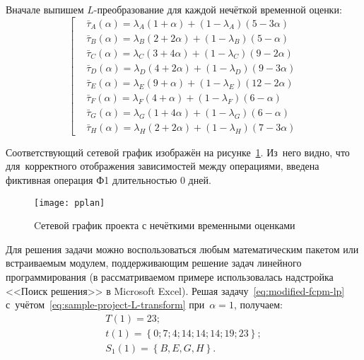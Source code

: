 Вначале выпишем $L$-преобразование для каждой нечёткой временной оценки:
\begin{equation}
\label{eq:sample-project-L-transform}
\left[ \begin{aligned}
   & \bar{\tau}_A\left( \alpha \right)=\lambda_A\left( 1+\alpha \right)+\left( 1-\lambda_A \right)\left( 5-3\alpha \right) \\ 
   & \bar{\tau}_B\left( \alpha \right)=\lambda_B\left( 2+2\alpha \right)+\left( 1-\lambda_B \right)\left( 5-\alpha \right) \\ 
   & \bar{\tau}_C\left( \alpha \right)=\lambda_C\left( 3+4\alpha \right)+\left( 1-\lambda_C \right)\left( 9-2\alpha \right) \\ 
   & \bar{\tau}_D\left( \alpha \right)=\lambda_D\left( 4+2\alpha \right)+\left( 1-\lambda_D \right)\left( 9-3\alpha \right) \\ 
   & \bar{\tau}_E\left( \alpha \right)=\lambda_E\left( 9+\alpha \right)+\left( 1-\lambda_E \right)\left( 12-2\alpha \right) \\ 
   & \bar{\tau}_F\left( \alpha \right)=\lambda_F\left( 4+\alpha \right)+\left( 1-\lambda_F \right)\left( 6-\alpha \right) \\ 
   & \bar{\tau}_G\left( \alpha \right)=\lambda_G\left( 1+4\alpha \right)+\left( 1-\lambda_G \right)\left( 6-\alpha \right) \\ 
   & \bar{\tau}_H\left( \alpha \right)=\lambda_H\left( 2+2\alpha \right)+\left( 1-\lambda_H \right)\left( 7-3\alpha \right)
\end{aligned} \right.
\end{equation}

Соответствующий сетевой график изображён на рисунке~\ref{fig:pplan}. Из~него видно, что для~корректного отображения зависимостей между операциями, введена фиктивная операция Ф1 длительностью 0 дней.
\begin{figure}[h!]
  \centering
  {
    \texttt{[image: pplan]}
    \caption{Cетевой график проекта с нечёткими временными оценками}
    \label{fig:pplan}
  }
\end{figure}

Для решения задачи можно воспользоваться любым математическим пакетом или встраиваемым модулем, поддерживающим решение задач линейного программирования (в рассматриваемом примере использовалась надстройка <<Поиск решения>> в Microsoft Excel). Решая задачу~\eqref{eq:modified-fcpm-lp} с~учётом~\eqref{eq:sample-project-L-transform} при~$\alpha=1$, получаем:
\begin{gather*}
  T\left( 1 \right)=23; \\ 
  t\left( 1 \right)=\left\{ 0;7;4;14;14;14;19;23 \right\}; \\ 
  S_1\left( 1 \right)=\left\{ B,E,G,H \right\}.
\end{gather*}

